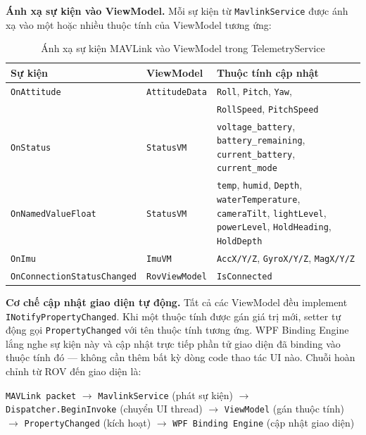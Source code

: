 \documentclass[../DoAn.tex]{subfiles}
\begin{document}
\textbf{Ánh xạ sự kiện vào ViewModel.}
Mỗi sự kiện từ \texttt{MavlinkService} được ánh xạ vào một hoặc
nhiều thuộc tính của ViewModel tương ứng:

\begin{table}[H]
\centering
\renewcommand{\arraystretch}{1.3}
\begin{tabular}{|l|l|p{4.5cm}|}
\hline
\textbf{Sự kiện} & \textbf{ViewModel} & \textbf{Thuộc tính cập nhật} \\
\hline
\texttt{OnAttitude} & \texttt{AttitudeData} &
    \texttt{Roll}, \texttt{Pitch}, \texttt{Yaw},\\
    & & \texttt{RollSpeed}, \texttt{PitchSpeed} \\
\hline
\texttt{OnStatus} & \texttt{StatusVM} &
    \texttt{voltage\_battery}, \texttt{battery\_remaining},
    \texttt{current\_battery}, \texttt{current\_mode} \\
\hline
\texttt{OnNamedValueFloat} & \texttt{StatusVM} &
    \texttt{temp}, \texttt{humid}, \texttt{Depth},
    \texttt{waterTemperature}, \texttt{cameraTilt},
    \texttt{lightLevel}, \texttt{powerLevel},
    \texttt{HoldHeading}, \texttt{HoldDepth} \\
\hline
\texttt{OnImu} & \texttt{ImuVM} &
    \texttt{AccX/Y/Z}, \texttt{GyroX/Y/Z},
    \texttt{MagX/Y/Z} \\
\hline
\texttt{OnConnectionStatusChanged} & \texttt{RovViewModel} &
    \texttt{IsConnected} \\
\hline
\end{tabular}
\caption{Ánh xạ sự kiện MAVLink vào ViewModel trong TelemetryService}
\label{tab:telemetry_mapping}
\end{table}

\textbf{Cơ chế cập nhật giao diện tự động.}
Tất cả các ViewModel đều implement \texttt{INotifyPropertyChanged}.
Khi một thuộc tính được gán giá trị mới, setter tự động gọi
\texttt{PropertyChanged} với tên thuộc tính tương ứng. WPF Binding
Engine lắng nghe sự kiện này và cập nhật trực tiếp phần tử giao diện
đã binding vào thuộc tính đó --- không cần thêm bất kỳ dòng code
thao tác UI nào. Chuỗi hoàn chỉnh từ ROV đến giao diện là:

\begin{center}
\texttt{MAVLink packet} $\rightarrow$ \texttt{MavlinkService} (phát sự kiện)
$\rightarrow$ \texttt{Dispatcher.BeginInvoke} (chuyển UI thread)
$\rightarrow$ \texttt{ViewModel} (gán thuộc tính)
$\rightarrow$ \texttt{PropertyChanged} (kích hoạt)
$\rightarrow$ \texttt{WPF Binding Engine} (cập nhật giao diện)
\end{center}
\end{document}
